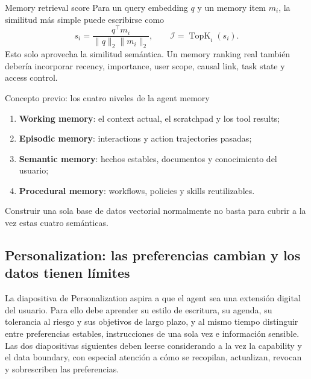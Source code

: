 \begin{importantbox}{Memory retrieval score}
Para un query embedding $q$ y un memory item $m_i$, la similitud más simple puede escribirse como
\[
s_i=\frac{q^\top m_i}{\lVert q\rVert_2\lVert m_i\rVert_2},\qquad
\mathcal{I}=\operatorname{TopK}_i(s_i).
\]
Esto solo aprovecha la similitud semántica. Un memory ranking real también debería incorporar recency, importance, user scope, causal link, task state y access control.
\end{importantbox}

\begin{knowledgebox}{Concepto previo: los cuatro niveles de la agent memory}
\begin{enumerate}
  \item \textbf{Working memory}: el context actual, el scratchpad y los tool results;
  \item \textbf{Episodic memory}: interactions y action trajectories pasadas;
  \item \textbf{Semantic memory}: hechos estables, documentos y conocimiento del usuario;
  \item \textbf{Procedural memory}: workflows, policies y skills reutilizables.
\end{enumerate}
Construir una sola base de datos vectorial normalmente no basta para cubrir a la vez estas cuatro semánticas.
\end{knowledgebox}


\subsection{Personalization: las preferencias cambian y los datos tienen límites}

La diapositiva de Personalization aspira a que el agent sea una extensión digital del usuario. Para ello debe aprender su estilo de escritura, su agenda, su tolerancia al riesgo y sus objetivos de largo plazo, y al mismo tiempo distinguir entre preferencias estables, instrucciones de una sola vez e información sensible. Las dos diapositivas siguientes deben leerse considerando a la vez la capability y el data boundary, con especial atención a cómo se recopilan, actualizan, revocan y sobrescriben las preferencias.

